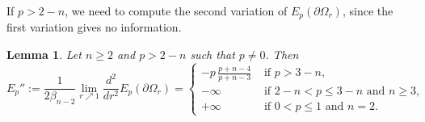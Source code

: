 \documentclass[10pt,leqno]{amsart}
\newcommand{\p}{\partial}
\numberwithin{Theorem}{section}
\newtheorem{Lemma}[Theorem]{Lemma}
\theoremstyle{definition}
\theoremstyle{remark}
\numberwithin{equation}{section}
\numberwithin{equation}{section}
\begin{document}
 

If $p>2-n$, we need to  compute the second variation of $E_p(\p \Omega_r)$, since the first variation gives no information. 

\begin{Lemma}\label{lm:second_variation_Ep}Let $n\geq 2$ and $p>2-n$ such that $p\neq 0$. Then$$  E_p'':=\frac{1}{2\beta_{n-2}}\lim_{r\nearrow 1}  \frac{d^2}{dr^2} E_p(\partial\Omega_r) 
  =\begin{cases}
    -p\,\displaystyle{\frac{p+n-4}{p+n-3}} & \text{ if } p>3-n, \\[3mm]
    -\infty & \text{ if } 2-n < p \le 3-n \text{ and } n \ge 3, \\[2mm]
    +\infty & \text{ if } 0 < p \le 1 \text{ and } n = 2.
   \end{cases}$$
   \end{Lemma}
\end{document}
